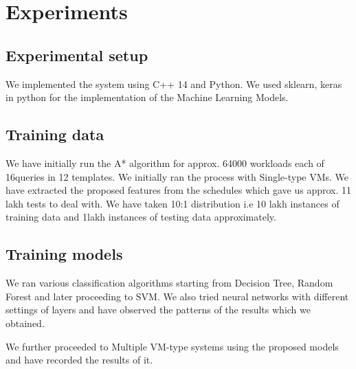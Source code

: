 \chapter{Experiments}
\section{Experimental setup}
We implemented the system using C++ 14 and Python. We used sklearn\cite{pedregosa2011scikit}, keras\cite{chollet2013keras} in python for the implementation of the Machine Learning Models. 

\section {Training data}
We have initially run the A* algorithm \cite{hart1968formal} for approx. 64000 workloads each of 16queries in 12 templates. We initially ran the process with Single-type VMs. We have extracted the proposed features from the schedules which gave us approx. 11 lakh tests to deal with. We have taken 10:1 distribution i.e 10 lakh instances of training data and 1lakh instances of testing data approximately. 

\section{Training models}
We ran various classification algorithms starting from Decision Tree\cite{quinlan1987simplifying}, Random Forest\cite{liaw2002classification} and later proceeding to SVM\cite{suykens1999least}. We also tried neural networks\cite{maind2014research} with different settings of layers and have observed the patterns of the results which we obtained.

We further proceeded to Multiple VM-type systems using the proposed models and have recorded the results of it.